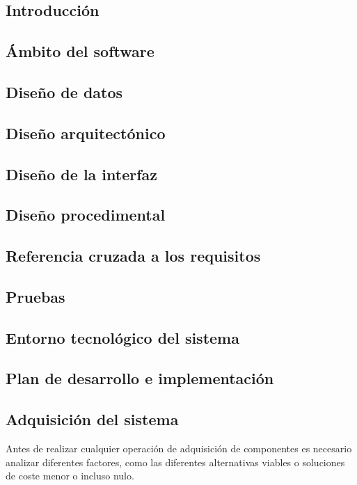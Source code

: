 \subsection{Introducción}
\subsection{Ámbito del software}
\subsection{Diseño de datos}
\subsection{Diseño arquitectónico}
\subsection{Diseño de la interfaz}
\subsection{Diseño procedimental}
\subsection{Referencia cruzada a los requisitos}
\subsection{Pruebas}
\subsection{Entorno tecnológico del sistema}
\subsection{Plan de desarrollo e implementación}


\subsection{Adquisición del sistema}

Antes de realizar cualquier operación de adquisición de componentes es necesario analizar diferentes factores, como las diferentes alternativas viables o soluciones de coste menor o incluso nulo.

